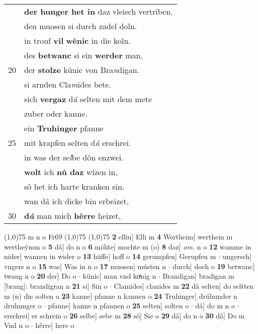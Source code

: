 \documentclass[8pt,a4paper,notitlepage]{article}
\begin{document}
\begin{table}[ht]
\begin{minipage}[t]{0.5\linewidth}
\begin{tabular}{rl}
 & \textbf{der hunger het in} daz vleisch vertriben.\\ 
 & den muosen si durch zadel doln.\\ 
 & in trouf \textbf{vil} \textbf{wênic} in die koln.\\ 
 & des \textbf{betwanc} si ein \textbf{werder} man,\\ 
20 & der \textbf{stolze} künic von Bra\textit{n}digan.\\ 
 & si arnden Cla\textit{m}ides bete.\\ 
 & sich \textbf{vergaz} d\textit{â} selten mit dem mete\\ 
 & zuber oder kanne.\\ 
 & ein \textbf{Truhinger} pfanne\\ 
25 & mit krapfen selten d\textit{â} erschrei.\\ 
 & in was der se\textit{l}be dôn enzwei.\\ 
 & \textbf{wolt} ich \textbf{nû daz} wîzen in,\\ 
 & sô het ich harte kranken sin.\\ 
 & wan dâ ich dicke bin erbeizet,\\ 
30 & \textbf{d\textit{â}} man mich \textbf{hêrre} heizet,\\ 
\end{tabular}
\scriptsize
\line(1,0){75} \newline
m n o Fr69 \newline
\line(1,0){75} \newline
\newline
\line(1,0){75} \newline
\textbf{2} elliu] Elli m \textbf{4} Wertheim] werthein m wertheẏmm o \textbf{5} dâ] do n o \textbf{6} möhte] mochte m (o) \textbf{8} daz] \textit{om.} n o \textbf{12} wamme in nider] wannen in wider o \textbf{13} hüffe] hoff o \textbf{14} gerumpfen] Gerupfen m  $\cdot$ ungersch] vngers n o \textbf{15} was] Was in n o \textbf{17} muosen] músten n  $\cdot$ durch] doch o \textbf{19} betwanc] twang n o \textbf{20} der] Do o  $\cdot$ künic] man vnd koͯnig n  $\cdot$ Brandigan] bradigan m [brang]: brandigran n \textbf{21} si] Sin o  $\cdot$ Clamides] clanides m \textbf{22} dâ selten] do seltten m (n) die solten o \textbf{23} kanne] pfanne n kannen o \textbf{24} Truhinger] drúhunder n druhunger o  $\cdot$ pfanne] kanne n pfannen o \textbf{25} selten] solten o  $\cdot$ dâ] do m n o  $\cdot$ erschrei] er schrein o \textbf{26} selbe] sebe m \textbf{28} sô] Sie o \textbf{29} dâ] do n o \textbf{30} dâ] Do m Vnd n o  $\cdot$ hêrre] here o \newline
\end{minipage}
\end{table}
\end{document}
